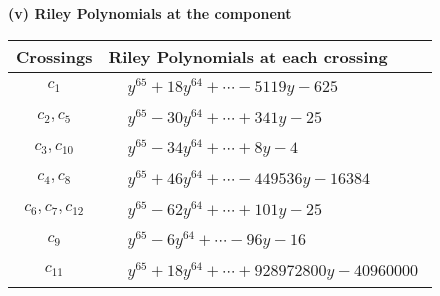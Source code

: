 \documentclass[1p]{elsarticle_modified}
\theoremstyle{definition}
\begin{document}
\newpage\renewcommand{\arraystretch}{1}
\flushleft \textbf{(v) Riley Polynomials at the component}\newline \\
\begin{tabular}{m{50pt}|m{274pt}}
Crossings & \hspace{64pt}Riley Polynomials at each crossing \\
\hline $$\begin{aligned}c_{1}\end{aligned}$$&$\begin{aligned}
&y^{65}+18 y^{64}+\cdots-5119 y-625
\end{aligned}$\\
\hline $$\begin{aligned}c_{2},c_{5}\end{aligned}$$&$\begin{aligned}
&y^{65}-30 y^{64}+\cdots+341 y-25
\end{aligned}$\\
\hline $$\begin{aligned}c_{3},c_{10}\end{aligned}$$&$\begin{aligned}
&y^{65}-34 y^{64}+\cdots+8 y-4
\end{aligned}$\\
\hline $$\begin{aligned}c_{4},c_{8}\end{aligned}$$&$\begin{aligned}
&y^{65}+46 y^{64}+\cdots-449536 y-16384
\end{aligned}$\\
\hline $$\begin{aligned}c_{6},c_{7},c_{12}\end{aligned}$$&$\begin{aligned}
&y^{65}-62 y^{64}+\cdots+101 y-25
\end{aligned}$\\
\hline $$\begin{aligned}c_{9}\end{aligned}$$&$\begin{aligned}
&y^{65}-6 y^{64}+\cdots-96 y-16
\end{aligned}$\\
\hline $$\begin{aligned}c_{11}\end{aligned}$$&$\begin{aligned}
&y^{65}+18 y^{64}+\cdots+928972800 y-40960000
\end{aligned}$\\
\hline
\end{tabular}\\~\\
\end{document}
